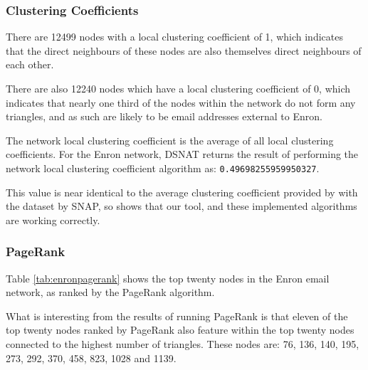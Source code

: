 \subsubsection{Clustering Coefficients}
There are 12499 nodes with a local clustering coefficient of 1, which indicates that the direct neighbours of these nodes are also themselves direct neighbours of each other.

There are also 12240 nodes which have a local clustering coefficient of 0, which indicates that nearly one third of the nodes within the network do not form any triangles, and as such are likely to be email addresses external to Enron.

The network local clustering coefficient is the average of all local clustering coefficients. For the Enron network, DSNAT returns the result of performing the network local clustering coefficient algorithm as: {\tt 0.49698255959950327}.

This value is near identical to the average clustering coefficient provided by with the dataset by SNAP, so shows that our tool, and these implemented algorithms are working correctly.

\subsubsection{PageRank}
Table \ref{tab:enronpagerank} shows the top twenty nodes in the Enron email network, as ranked by the PageRank algorithm.

What is interesting from the results of running PageRank is that eleven of the top twenty nodes ranked by PageRank also feature within the top twenty nodes connected to the highest number of triangles. These nodes are: 76, 136, 140, 195, 273, 292, 370, 458, 823, 1028 and 1139.

